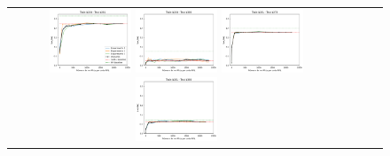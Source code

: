 \begin{figure}[h!]
\begin{tabular}{cccc}
  \includegraphics[width=0.25\textwidth]{Kap7/train=b234_test=b261_linear_individual_curves.png}  \includegraphics[width=0.25\textwidth]{Kap7/train=b234_test=b360_linear_individual_curves.png}
  \includegraphics[width=0.25\textwidth]{Kap7/train=b261_test=b278_linear_individual_curves.png}  \includegraphics[width=0.25\textwidth]{Kap7/train=b261_test=b360_linear_individual_curves.png} \\


\end{tabular}
\end{figure}

